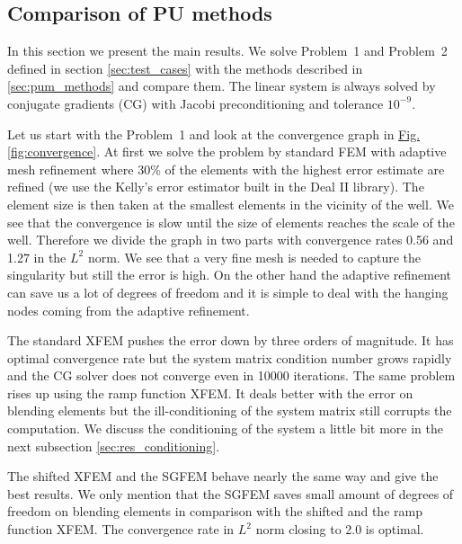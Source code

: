 \documentclass{elsarticle}
\newcommand{\prob}[1]{Problem~{#1}}
\newcommand{\fig}[1]{\hyperref[#1]{Fig.\ref{#1}}}
\begin{document}
\subsection{Comparison of PU methods} \label{sec:res_comparison}
In this section we present the main results. We solve \prob{1} and \prob{2} 
defined in section \ref{sec:test_cases} with the methods described in \ref{sec:pum_methods} and compare them.
The linear system is always solved by conjugate gradients (CG) with Jacobi preconditioning 
and tolerance $10^{-9}$.

Let us start with the \prob{1} and look at the convergence graph in \fig{fig:convergence}.
At first we solve the problem by standard FEM with adaptive mesh refinement where 30\% of the elements
with the highest error estimate are refined (we use the Kelly's error estimator built in the Deal II library).
The element size is then taken at the smallest elements in the 
vicinity of the well. We see that the convergence is slow until the size of elements reaches the scale of the
well. Therefore we divide the graph in two parts with convergence rates 0.56 and 1.27 in the $L^2$ norm.
We see that a very fine mesh is needed to capture the singularity but still the error is high.
On the other hand the adaptive refinement can save us a lot of degrees of freedom and it is simple to deal 
with the hanging nodes coming from the adaptive refinement. 

The standard XFEM pushes the error down by three orders of magnitude. It has optimal convergence rate but the system
matrix condition number grows rapidly and the CG solver does not converge even in 10000 iterations. The same
problem rises up using the ramp function XFEM. It deals better with the error on blending elements but the
ill-conditioning of the system matrix still corrupts the computation. We discuss the conditioning of the system 
a little bit more in the next subsection \ref{sec:res_conditioning}.

The shifted XFEM and the SGFEM behave nearly the same way and give the best results. We only mention that the SGFEM saves 
small amount of degrees of freedom on blending elements in comparison with the shifted and the ramp function XFEM.
The convergence rate in $L^2$ norm closing to 2.0 is optimal.
\end{document}
